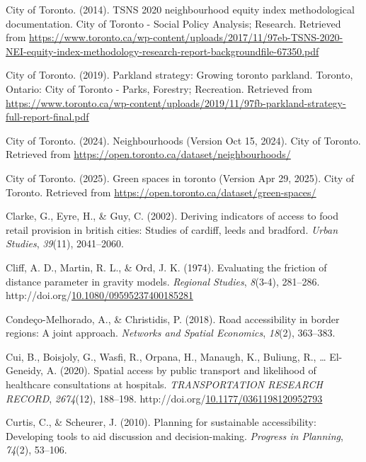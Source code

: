 \documentclass[
11pt, %
oneside, %
english, %
singlespacing, %
]{macthesis} %
\newlength{\cslhangindent}
\newenvironment{CSLReferences}[2] %
{\begin{list}{}{%
	\setlength{\itemindent}{0pt}
	\setlength{\leftmargin}{0pt}
	\setlength{\parsep}{0pt}
	\ifodd #1
	\setlength{\leftmargin}{\cslhangindent}
	\setlength{\itemindent}{-1\cslhangindent}
	\fi
	\setlength{\itemsep}{#2\baselineskip}}}
{\end{list}}
\begin{document}
\begin{CSLReferences}{1}{0}
City of Toronto. (2014). TSNS 2020 neighbourhood equity index methodological documentation. City of Toronto - Social Policy Analysis; Research. Retrieved from \url{https://www.toronto.ca/wp-content/uploads/2017/11/97eb-TSNS-2020-NEI-equity-index-methodology-research-report-backgroundfile-67350.pdf}

City of Toronto. (2019). Parkland strategy: Growing toronto parkland. Toronto, Ontario: City of Toronto - Parks, Forestry; Recreation. Retrieved from \url{https://www.toronto.ca/wp-content/uploads/2019/11/97fb-parkland-strategy-full-report-final.pdf}

City of Toronto. (2024). Neighbourhoods (Version Oct 15, 2024). City of Toronto. Retrieved from \url{https://open.toronto.ca/dataset/neighbourhoods/}

City of Toronto. (2025). Green spaces in toronto (Version Apr 29, 2025). City of Toronto. Retrieved from \url{https://open.toronto.ca/dataset/green-spaces/}

Clarke, G., Eyre, H., \& Guy, C. (2002). Deriving indicators of access to food retail provision in british cities: Studies of cardiff, leeds and bradford. \emph{Urban Studies}, \emph{39}(11), 2041--2060.

Cliff, A. D., Martin, R. L., \& Ord, J. K. (1974). Evaluating the friction of distance parameter in gravity models. \emph{Regional Studies}, \emph{8}(3-4), 281--286. http://doi.org/\href{https://doi.org/10.1080/09595237400185281}{10.1080/09595237400185281}

Condeço-Melhorado, A., \& Christidis, P. (2018). Road accessibility in border regions: A joint approach. \emph{Networks and Spatial Economics}, \emph{18}(2), 363--383.

Cui, B., Boisjoly, G., Wasfi, R., Orpana, H., Manaugh, K., Buliung, R., \ldots{} El-Geneidy, A. (2020). Spatial access by public transport and likelihood of healthcare consultations at hospitals. \emph{{TRANSPORTATION} {RESEARCH} {RECORD}}, \emph{2674}(12), 188--198. http://doi.org/\href{https://doi.org/10.1177/0361198120952793}{10.1177/0361198120952793}

Curtis, C., \& Scheurer, J. (2010). Planning for sustainable accessibility: Developing tools to aid discussion and decision-making. \emph{Progress in Planning}, \emph{74}(2), 53--106.


\end{CSLReferences}
\end{document}

